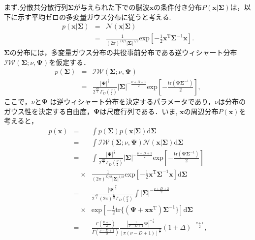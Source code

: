 \documentclass[journal]{IEEEtran}
\begin{document}
まず,分散共分散行列$\bm \Sigma$が与えられた下での脳波$\mathbf{x}$の条件付き分布$P(\mathbf{x}|\mathbf{\Sigma})$は，以下に示す平均ゼロの多変量ガウス分布に従うと考える.
%
\begin{eqnarray}
	p(\mathbf{x}|{\bm \Sigma}) &=& {\mathcal N}(\mathbf{x}|{\bm \Sigma}) \nonumber\\
&=& \frac{1}{(2\pi)^{D/2} |\mathbf{\Sigma}|^{1/2}} \mathrm{exp} \left[-\frac{1}{2}\mathbf{x}^\mathrm{T} {\bm \Sigma}^{-1} \mathbf{x}\right]. \label{eq:gauss_x}
\label{eq:p_x_sigma} %
\end{eqnarray}
%
$\mathbf{\Sigma}$の分布には，多変量ガウス分布の共役事前分布である逆ウィシャート分布${\mathcal {IW}}({\bm \Sigma}; \nu, {\bm \Psi})$を仮定する．
%
\begin{eqnarray}
	p({\bm \Sigma}) &=& {\mathcal {IW}}({\bm \Sigma};\nu,{\bm \Psi}) \nonumber\\
&=& \frac{|{\bm \Psi}|^{\frac{\nu}{2}}}{2^{\frac{\nu D}{2}} \Gamma_D \left(\frac{\nu}{2}\right)} |\bm \Sigma|^{-\frac{\nu+D+1}{2}} \mathrm{exp} \left[-\frac{\mathrm{tr}(\bm \Psi \bm \Sigma^{-1})}{2}\right],\label{eq:p_sigma} %
\end{eqnarray}
%
ここで，$\nu$と${\bm \Psi}$ は逆ウィシャート分布を決定するパラメータであり，$\nu$は分布のガウス性を決定する自由度，${\bm \Psi}$は尺度行列である．いま, $\mathbf{x}$の周辺分布$P(\mathbf{x})$を考えると，
\begin{eqnarray}
	p(\mathbf{x}) &=& \int p({\bm \Sigma})p(\mathbf{x}|{\bm \Sigma}) \mathrm{d}{\bm \Sigma} \nonumber \\
		&=& \int {\mathcal {IW}}({\bm \Sigma}; \nu, {\bm \Psi}) {\mathcal N}(\mathbf{x}|{\bm \Sigma}) \mathrm{d}{\bm \Sigma} \label{eq:marginal_x} \\ %
		&=& \int \frac{|{\bm \Psi}|^{\frac{\nu}{2}}}{2^{\frac{\nu D}{2}} \Gamma_D \left(\frac{\nu}{2}\right)} |\mathbf{\Sigma}|^{-\frac{\nu+D+1}{2}}\mathrm{exp} \left[-\frac{\mathrm{tr}(\bm \Psi \bm \Sigma^{-1})}{2}\right] \nonumber\\
&\quad \times&\frac{1}{(2\pi)^{D/2} |\mathbf{\Sigma}|^{1/2}} \mathrm{exp} \left[-\frac{1}{2}\mathbf{x}^\mathrm{T} {\bm \Sigma}^{-1} \mathbf{x}\right] \mathrm{d}{\bm \Sigma} \nonumber \\
		&=& \frac{|{\bm \Psi}|^{\frac{\nu}{2}}}{2^{\frac{\nu D}{2}} (2\pi)^\frac{D}{2} \Gamma_D \left(\frac{\nu}{2}\right)} \int |\mathbf{\Sigma}|^{-\frac{\nu+D+2}{2}}\nonumber\\
&\quad \times&\mathrm{exp} \left[-\frac{1}{2}\mathrm{tr}\{(\bm \Psi + \mathbf{x} \mathbf{x}^\mathrm{T})\bm \Sigma^{-1}\}\right] \mathrm{d}{\bm \Sigma} \nonumber \\
\label{eq:p_x}
&=& \frac{\Gamma(\frac{\nu+1}{2})}{\Gamma(\frac{\nu-D+1}{2})} \frac{|\frac{1}{\nu-D+1} {\bm \Psi}|^{-\frac{1}{2}}}{\left[\pi(\nu-D+1) \right]^{\frac{D}{2}}} (1+\Delta)^{-\frac{\nu+1}{2}} ,%
\end{eqnarray}
\end{document}
